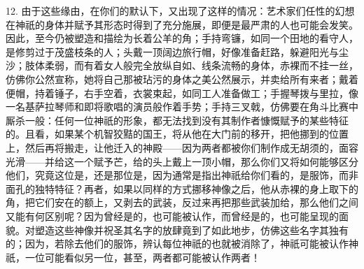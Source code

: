 12. 由于这些缘由，在你们的默认下，又出现了这样的情况：艺术家们任性的幻想在神祇的身体并赋予其形态时得到了充分施展，即便是最严肃的人也可能会发笑。因此，至今仍被塑造和描绘为长着公羊的角；手持弯镰，如同一个田地的看守人，是修剪过于茂盛枝条的人；头戴一顶阔边旅行帽，好像准备赶路，躲避阳光与尘沙；肢体柔弱，而有着女人般完全放纵自如、线条流畅的身体，赤裸而不挂一丝，仿佛你公然宣称，她将自己那被玷污的身体之美公然展示，并卖给所有来者；戴着便帽，持着锤子，右手空着，衣裳束起，如同工人准备做工；手握琴拨与里拉，像一名基萨拉琴师和即将歌唱的演员般作着手势；手持三叉戟，仿佛要在角斗比赛中厮杀一般：任何一位神祇的形象，都无法找到没有其制作者慷慨赋予的某些特征的。且看，如果某个机智狡黠的国王，将从他在大门前的移开，把他挪到的位置上，然后再将搬走，让他迁入的神殿——因为两者都被你们制作成无胡须的，面容光滑——并给这一个赋予芒，给的头上戴上一顶小帽，那么你们又将如何能够区分他们，究竟这位是，还是那位是，因为通常是指出神祇给你们看的，是服饰，而非面孔的独特特征？再者，如果以同样的方式挪移神像之后，他从赤裸的身上取下的角，把它们安在的额上，又剥去的武装，反过来再把那些武装加给，那么他们之间又能有何区别呢？因为曾经是的，也可能被认作，而曾经是的，也可能呈现的面貌。对塑造这些神像并祝圣其名字的放肆竟到了如此地步，仿佛这些名字其独有的；因为，若除去他们的服饰，辨认每位神祇的也就被消除了，神祇可能被认作神祇，一位可能看似另一位，甚至，两者都可能被认作两者！\par

